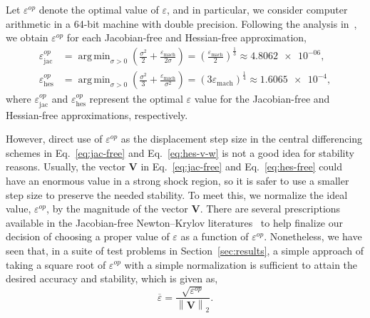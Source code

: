 \documentclass[times,preprint,3p]{elsarticle}
\newcommand{\bV}{\mathbf{V}}
\DeclareMathOperator*{\argmin}{arg\,min}
\begin{document}
Let \( \varepsilon^{op} \) denote the optimal value of \( \varepsilon \), and in particular, we consider
computer arithmetic in a 64-bit machine with double precision.
Following the analysis in~\cite{an2011finite}, we obtain \( \varepsilon^{op} \) for each
Jacobian-free and Hessian-free approximation,
%
\begin{equation}\label{eq:sigma}
    \begin{split}
        \varepsilon^{op}_{\text{jac}} &= \argmin_{\sigma > 0}
        \left( \frac{\sigma^{2}}{2} + \frac{\varepsilon_{\text{mach}}}{2 \sigma} \right) =
        {\left( \frac{\varepsilon_{\text{mach}}}{2} \right)}^{\frac{1}{3}} \approx \num{4.8062e-06},\\
        \varepsilon^{op}_{\text{hes}} &= \argmin_{\sigma > 0}
        \left( \frac{\sigma^{2}}{3} + \frac{\varepsilon_{\text{mach}}}{\sigma^{2}} \right) =
        {\left( 3 \varepsilon_{\text{mach}} \right)}^{\frac{1}{4}} \approx \num{1.6065e-4},
    \end{split}
\end{equation}
where \( \varepsilon^{op}_{\text{jac}} \) and \( \varepsilon^{op}_{\text{hes}} \)
represent the optimal
$\varepsilon$
value for the Jacobian-free and Hessian-free approximations, respectively.

However, direct use of \( \varepsilon^{op} \) as
the displacement step size in the central differencing schemes
in Eq.~\eqref{eq:jac-free} and Eq.~\eqref{eq:hes-v-w}
is not a good idea for stability reasons.
%
Usually, the vector \( \bV \) in
Eq.~\eqref{eq:jac-free} and Eq.~\eqref{eq:hes-free} could have an
enormous value in a strong shock region, so it is safer to use
a smaller step size to preserve the needed stability. To meet this,
we normalize the ideal value, \( \varepsilon^{op} \),
by the magnitude of the vector \( \bV \).
%
There are several prescriptions available
in the Jacobian-free Newton–Krylov
literatures~\cite{knoll2004jacobian, brown1990hybrid}
to help finalize our decision of choosing a proper value of \( \varepsilon \)
as a function of  \( \varepsilon^{op} \).
%
Nonetheless, we have seen that,
in a suite of test problems in Section~\ref{sec:results},
a simple approach of
taking a square root of \( \varepsilon^{op} \)
with a simple normalization is sufficient to attain the desired accuracy and stability,
which is given as,
%
\begin{equation}\label{eq:eps}
    \overline{\varepsilon} = \frac{\sqrt{\varepsilon^{op}}}{\left\lVert \bV \right\rVert_{2}}.
\end{equation}
\end{document}
